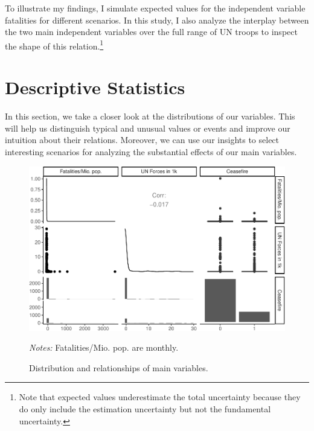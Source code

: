 \documentclass[12pt,english,a4paper,oneside]{article}
\begin{document}
\phantom{This text will be invisible}

\noindent
To illustrate my findings, I simulate expected values for the independent variable fatalities for different scenarios. In this study, I also analyze the interplay between the two main independent variables over the full range of UN troops to inspect the shape of this relation.\footnote{Note that expected values underestimate the total uncertainty because they do only include the estimation uncertainty but not the fundamental uncertainty.}

\hypertarget{descriptive-statistics}{%
\section{Descriptive Statistics}\label{descriptive-statistics}}

In this section, we take a closer look at the distributions of our variables. This will help us distinguish typical and unusual values or events and improve our intuition about their relations. Moreover, we can use our insights to select interesting scenarios for analyzing the substantial effects of our main variables.

\phantom{This text will be invisible}

\begin{figure}[H]
\includegraphics[width=\textwidth]{figs/desc-main-1} \caption[Distribution and relationships of main variables]{Distribution and relationships of main variables.}\label{fig:desc-main}
\vspace{0.5cm} \footnotesize{\textit{Notes: }Fatalities/Mio. pop. are monthly.} \end{figure}
\end{document}

